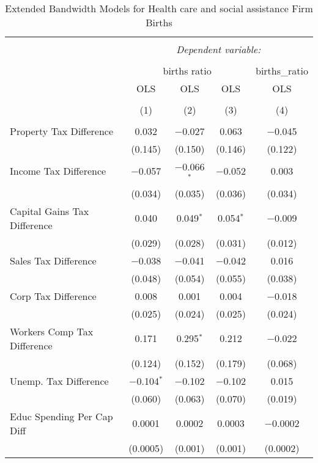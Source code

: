 
\begin{table}[!htbp] \centering 
  \caption{Extended Bandwidth Models for  Health care and social assistance Firm Births} 
  \label{62eb} 
\begin{tabular}{@{\extracolsep{5pt}}lcccc} 
\\[-1.8ex]\hline 
\hline \\[-1.8ex] 
 & \multicolumn{4}{c}{\textit{Dependent variable:}} \\ 
\cline{2-5} 
\\[-1.8ex] & \multicolumn{3}{c}{births ratio} & births\_ratio \\ 
 & OLS & OLS & OLS & OLS \\ 
\\[-1.8ex] & (1) & (2) & (3) & (4)\\ 
\hline \\[-1.8ex] 
 Property Tax Difference & 0.032 & $-$0.027 & 0.063 & $-$0.045 \\ 
  & (0.145) & (0.150) & (0.146) & (0.122) \\ 
  Income Tax Difference & $-$0.057 & $-$0.066$^{*}$ & $-$0.052 & 0.003 \\ 
  & (0.034) & (0.035) & (0.036) & (0.034) \\ 
  Capital Gains Tax Difference & 0.040 & 0.049$^{*}$ & 0.054$^{*}$ & $-$0.009 \\ 
  & (0.029) & (0.028) & (0.031) & (0.012) \\ 
  Sales Tax Difference & $-$0.038 & $-$0.041 & $-$0.042 & 0.016 \\ 
  & (0.048) & (0.054) & (0.055) & (0.038) \\ 
  Corp Tax Difference & 0.008 & 0.001 & 0.004 & $-$0.018 \\ 
  & (0.025) & (0.024) & (0.025) & (0.024) \\ 
  Workers Comp Tax Difference & 0.171 & 0.295$^{*}$ & 0.212 & $-$0.022 \\ 
  & (0.124) & (0.152) & (0.179) & (0.068) \\ 
  Unemp. Tax Difference & $-$0.104$^{*}$ & $-$0.102 & $-$0.102 & 0.015 \\ 
  & (0.060) & (0.063) & (0.070) & (0.019) \\ 
  Educ Spending Per Cap Diff & 0.0001 & 0.0002 & 0.0003 & $-$0.0002 \\ 
  & (0.0005) & (0.001) & (0.001) & (0.0002) \\ 

\end{tabular}
\end{table}
